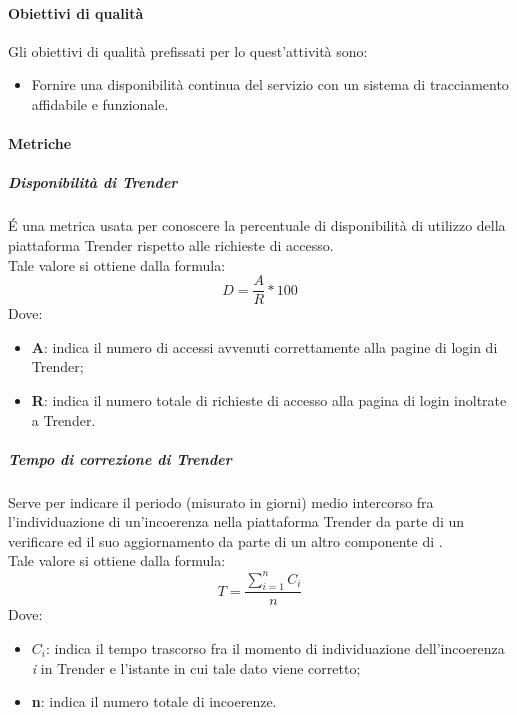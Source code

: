 \documentclass[../NormeDiProgetto_v4.0.0.tex]{subfiles}
\begin{document}
			\paragraph{Obiettivi di qualità}
				Gli obiettivi di qualità prefissati per lo quest'attività sono:
				\begin{itemize}
					\item Fornire una disponibilità continua del servizio con un sistema di tracciamento affidabile e funzionale.
				\end{itemize}
			\paragraph{Metriche}
			\subparagraph{Disponibilità di Trender}
				É una metrica usata per conoscere la percentuale di disponibilità di utilizzo della piattaforma Trender rispetto alle richieste di accesso.\\Tale valore si ottiene dalla formula:
				\begin{equation*}
					D = \frac{A}{R} * 100
				\end{equation*}
				Dove:
				\begin{itemize}
					\item \textbf{A}: indica il numero di accessi avvenuti correttamente alla pagine di login di Trender;
					\item \textbf{R}: indica il numero totale di richieste di accesso alla pagina di login inoltrate a Trender.
				\end{itemize}
				
			\subparagraph{Tempo di correzione di Trender}
				Serve per indicare il periodo (misurato in giorni) medio intercorso fra l'individuazione di un'incoerenza nella piattaforma Trender da parte di un verificare ed il suo aggiornamento da parte di un altro componente di \kpanic.\\Tale valore si ottiene dalla formula:
				\begin{equation*}
					T =\frac{\sum_{i=1}^n C_{i}}{n}
				\end{equation*}
				Dove:
				\begin{itemize}
					\item \textbf{$C_{i}$}: indica il tempo trascorso fra il momento di individuazione dell'incoerenza \textit{i} in Trender e l'istante in cui tale dato viene corretto;
					\item \textbf{n}: indica il numero totale di incoerenze.
				\end{itemize}
\end{document}
